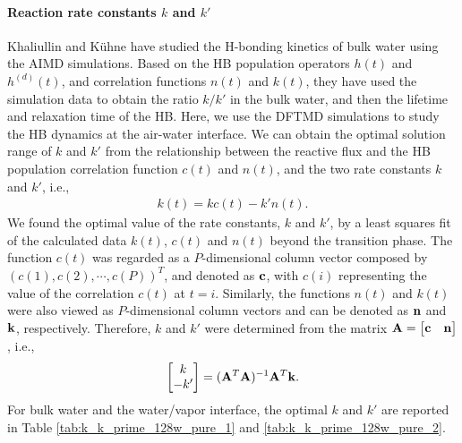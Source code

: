 \paragraph{Reaction rate constants $k$ and $k'$}
Khaliullin and K\"uhne have studied the H-bonding kinetics of bulk water using the AIMD simulations.\cite{Khaliullin2013}
Based on the HB population operators $h(t)$ and $h^{(d)}(t)$, and correlation functions $n(t)$ and $k(t)$, they have used the simulation data 
to obtain the ratio $k/k'$ in the bulk water, and then the lifetime and relaxation time 
of the HB.  Here, we use the DFTMD simulations to study the HB dynamics at the air-water interface.
We can obtain the optimal solution range of $k$ and $k'$ from the relationship between the reactive flux 
and the HB population correlation function $c(t)$ and $n(t)$, and the two rate constants $k$ and $k'$, i.e.,
\begin{eqnarray}
  k(t) = kc(t)-k'n(t).
\label{eq:fitting_k_rates}
\end{eqnarray}
We found the optimal value of the rate constants, $k$ and $k'$, 
by a least squares fit of the calculated data $k(t)$, $c(t)$ and $n(t)$ beyond the transition phase.  
The function $c(t)$ was regarded as a $P$-dimensional column vector composed by $(c(1),c(2),\cdots,c(P))^T$, and denoted as ${\bf c}$,
with $c(i)$ representing the value of the correlation $c(t)$ at $t=i$.
Similarly, the functions $n(t)$ and $k(t)$ were also viewed as $P$-dimensional column vectors and can be denoted as ${\bf n}$ and ${\bf k}$, respectively.
Therefore, $k$ and $k'$ were determined from the matrix ${\bf A} = \begin{bmatrix} {\bf c} & {\bf n} \end{bmatrix}$, i.e., 
\begin{equation}
\begin{bmatrix} k\\ -k' \end{bmatrix} = ({\bf A}^T {\bf A})^{-1} {\bf A}^T {\bf k}. 
\end{equation}
For bulk water and the water/vapor interface, the optimal $k$ and $k'$ are reported in Table 
\ref{tab:k_k_prime_128w_pure_1} and \ref{tab:k_k_prime_128w_pure_2}. 
% 
